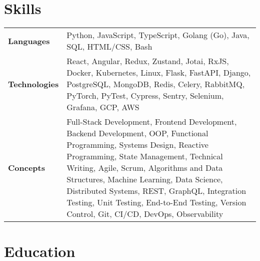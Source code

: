 \documentclass{ethan_cv}
\begin{document}
    \section{Skills}
        \small
        \begin{tabular}{p{2.25cm} p{16cm}}
            \textbf{Languages} & Python, JavaScript, TypeScript, Golang (Go), Java, SQL, HTML/CSS, Bash \\ 
            \addlinespace[1.5mm]
            \textbf{Technologies} & React, Angular, Redux, Zustand, Jotai, RxJS, Docker, Kubernetes, Linux, Flask, FastAPI, Django, PostgreSQL, MongoDB, Redis, Celery, RabbitMQ, PyTorch, PyTest, Cypress, Sentry, Selenium, Grafana, GCP, AWS \\
            \addlinespace[1.5mm]
            \textbf{Concepts} & Full-Stack Development, Frontend Development, Backend Development, OOP, Functional Programming, Systems Design, Reactive Programming, State Management, Technical Writing, Agile, Scrum, Algorithms and Data Structures, Machine Learning, Data Science, Distributed Systems, REST, GraphQL, Integration Testing, Unit Testing, End-to-End Testing, Version Control, Git, CI/CD, DevOps, Observability
        \end{tabular}
    \vspace{+3mm}


\section{Education}
\end{document}
